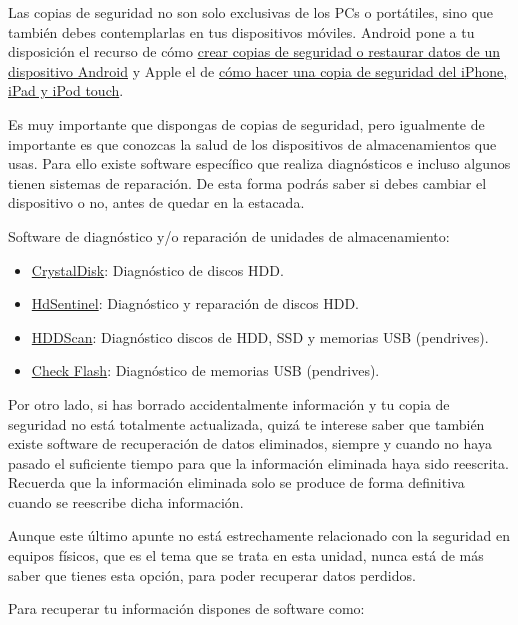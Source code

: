\documentclass[
  a4paper,
  openany]{book}
\begin{document}
Las copias de seguridad no son solo exclusivas de los PCs o portátiles, sino que también debes contemplarlas en tus dispositivos móviles. Android pone a tu disposición el recurso de cómo \href{https://support.google.com/android/answer/2819582?hl=es\&visit_id=637514255756661953-3969236140\&rd=1}{crear copias de seguridad o restaurar datos de un dispositivo Android} y Apple el de \href{https://support.apple.com/es-es/HT203977}{cómo hacer una copia de seguridad del iPhone, iPad y iPod touch}.

Es muy importante que dispongas de copias de seguridad, pero igualmente de importante es que conozcas la salud de los dispositivos de almacenamientos que usas. Para ello existe software específico que realiza diagnósticos e incluso algunos tienen sistemas de reparación. De esta forma podrás saber si debes cambiar el dispositivo o no, antes de quedar en la estacada.

Software de diagnóstico y/o reparación de unidades de almacenamiento:

\begin{itemize}
\item
  \href{https://crystalmark.info/en/software/crystaldiskinfo/}{CrystalDisk}: Diagnóstico de discos HDD.
\item
  \href{https://www.hdsentinel.com/}{HdSentinel}: Diagnóstico y reparación de discos HDD.
\item
  \href{https://hddscan.com/}{HDDScan}: Diagnóstico discos de HDD, SSD y memorias USB (pendrives).
\item
  \href{http://mikelab.kiev.ua/index_en.php?page=PROGRAMS/chkflsh_en}{Check Flash}: Diagnóstico de memorias USB (pendrives).
\end{itemize}

Por otro lado, si has borrado accidentalmente información y tu copia de seguridad no está totalmente actualizada, quizá te interese saber que también existe software de recuperación de datos eliminados, siempre y cuando no haya pasado el suficiente tiempo para que la información eliminada haya sido reescrita. Recuerda que la información eliminada solo se produce de forma definitiva cuando se reescribe dicha información.

Aunque este último apunte no está estrechamente relacionado con la seguridad en equipos físicos, que es el tema que se trata en esta unidad, nunca está de más saber que tienes esta opción, para poder recuperar datos perdidos.

Para recuperar tu información dispones de software como:
\end{document}
